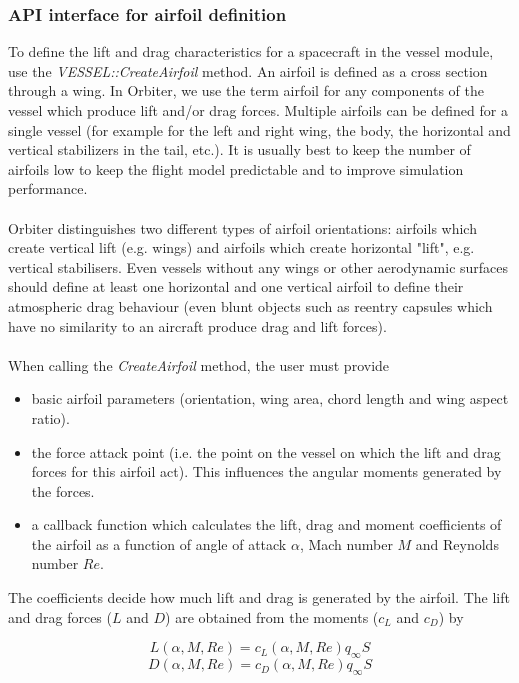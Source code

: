 \documentclass[Orbiter Developer Manual.tex]{subfiles}
\begin{document}
\subsubsection{API interface for airfoil definition}
To define the lift and drag characteristics for a spacecraft in the vessel module, use the \textit{VESSEL::\-CreateAirfoil} method. An airfoil is defined as a cross section through a wing. In Orbiter, we use the term airfoil for any components of the vessel which produce lift and/or drag forces. Multiple airfoils can be defined for a single vessel (for example for the left and right wing, the body, the horizontal and vertical stabilizers in the tail, etc.). It is usually best to keep the number of airfoils low to keep the flight model predictable and to improve simulation performance.\\
\\
Orbiter distinguishes two different types of airfoil orientations: airfoils which create vertical lift (e.g. wings) and airfoils which create horizontal "lift", e.g. vertical stabilisers. Even vessels without any wings or other aerodynamic surfaces should define at least one horizontal and one vertical airfoil to define their atmospheric drag behaviour (even blunt objects such as reentry capsules which have no similarity to an aircraft produce drag and lift forces).\\
\\
When calling the \textit{CreateAirfoil} method, the user must provide
\begin{itemize}
\item basic airfoil parameters (orientation, wing area, chord length and wing aspect ratio).
\item the force attack point (i.e. the point on the vessel on which the lift and drag forces for this airfoil act). This influences the angular moments generated by the forces.
\item a callback function which calculates the lift, drag and moment coefficients of the airfoil as a function of angle of attack $\alpha$, Mach number $M$ and Reynolds number $Re$.
\end{itemize}

\noindent
The coefficients decide how much lift and drag is generated by the airfoil. The lift and drag forces ($L$ and $D$) are obtained from the moments ($c_{L}$ and $c_{D}$) by

\[ L(\alpha,M,Re) = c_{L}(\alpha,M,Re)q_{\infty}S \]
\[ D(\alpha,M,Re) = c_{D}(\alpha,M,Re)q_{\infty}S \]
\end{document}
